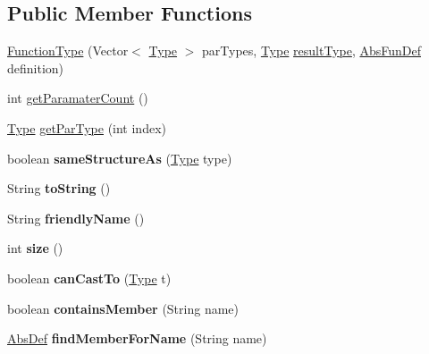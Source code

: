 \subsection*{Public Member Functions}
\begin{DoxyCompactItemize}
\item 
\hyperlink{classcompiler_1_1seman_1_1type_1_1_function_type_ae96461b609ab8e93d1bfd5bce5061620}{Function\+Type} (Vector$<$ \hyperlink{classcompiler_1_1seman_1_1type_1_1_type}{Type} $>$ par\+Types, \hyperlink{classcompiler_1_1seman_1_1type_1_1_type}{Type} \hyperlink{classcompiler_1_1seman_1_1type_1_1_function_type_a781f4364598c24eea8f9de8e92250386}{result\+Type}, \hyperlink{classcompiler_1_1abstr_1_1tree_1_1def_1_1_abs_fun_def}{Abs\+Fun\+Def} definition)
\item 
int \hyperlink{classcompiler_1_1seman_1_1type_1_1_function_type_a067366c087bfddeaaa8d57c3b85badd9}{get\+Paramater\+Count} ()
\item 
\hyperlink{classcompiler_1_1seman_1_1type_1_1_type}{Type} \hyperlink{classcompiler_1_1seman_1_1type_1_1_function_type_a26f6b4daa6bff5f4a21d135ca793fb7f}{get\+Par\+Type} (int index)
\item 
\mbox{\label{classcompiler_1_1seman_1_1type_1_1_function_type_a9b5c92f7356eabf172a988c52156092e}} 
boolean {\bfseries same\+Structure\+As} (\hyperlink{classcompiler_1_1seman_1_1type_1_1_type}{Type} type)
\item 
\mbox{\label{classcompiler_1_1seman_1_1type_1_1_function_type_a2c0cd628d0d0c4b40361624d65860ede}} 
String {\bfseries to\+String} ()
\item 
\mbox{\label{classcompiler_1_1seman_1_1type_1_1_function_type_a3a3b573f83dd2751829ec65ee823cc9b}} 
String {\bfseries friendly\+Name} ()
\item 
\mbox{\label{classcompiler_1_1seman_1_1type_1_1_function_type_a30febb4e9437b402db041e198174eb8a}} 
int {\bfseries size} ()
\item 
\mbox{\label{classcompiler_1_1seman_1_1type_1_1_function_type_ab4e3ce28fb51bb297131ac5601eb7d9d}} 
boolean {\bfseries can\+Cast\+To} (\hyperlink{classcompiler_1_1seman_1_1type_1_1_type}{Type} t)
\item 
\mbox{\label{classcompiler_1_1seman_1_1type_1_1_function_type_a22c4c86737fbf1529191850336d43bfc}} 
boolean {\bfseries contains\+Member} (String name)
\item 
\mbox{\label{classcompiler_1_1seman_1_1type_1_1_function_type_ae1a681b585f13c0bd1f37eae97b78f41}} 
\hyperlink{classcompiler_1_1abstr_1_1tree_1_1def_1_1_abs_def}{Abs\+Def} {\bfseries find\+Member\+For\+Name} (String name)
\end{DoxyCompactItemize}
